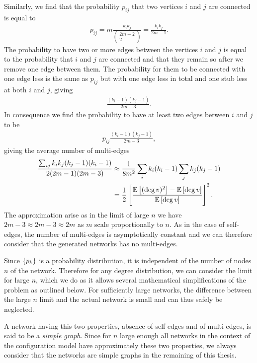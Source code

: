 \documentclass[
11pt, %
english, %
singlespacing, %
nolistspacing, %
liststotoc, %
headsepline, %
]{MastersDoctoralThesis} %
\begin{document}
Similarly, we find that the probability $p_{ij}$ that two vertices $i$ and $j$ are connected is equal to
\begin{align}
	p_{ij} = m \frac{k_i k_j}{ \begin{pmatrix} 2m - 2 \\ 2 \end{pmatrix} } = \frac{k_i k_j}{2 m -1}.
\end{align}
The probability to have two or more edges between the vertices $i$ and $j$ is equal to the probability that $i$ and $j$ are connected and that they remain so after we remove one edge between them. The probability for them to be connected with one edge less is the same as $p_{ij}$ but with one edge less in total and one stub less at both $i$ and $j$, giving
\begin{align}
	\frac{(k_i - 1)(k_j - 1)}{2 m - 3}.
\end{align}
In consequence we find the probability to have at least two edges between $i$ and $j$ to be
\begin{align}
	p_{ij} \frac{(k_i - 1)(k_j - 1)}{2 m - 3},
\end{align}
giving the average number of multi-edges
\begin{align}
	\frac{\sum_{ij} k_i k_j (k_j - 1) (k_i - 1)}{2 (2 m - 1)(2 m - 3)}  &\approx \frac{1}{8 m^2} \sum_i k_i(k_i - 1) \sum_j k_j(k_j - 1) \\
	&= \frac{1}{2}\left[ \frac{\mathbb{E}\left[ (\deg{v})^2 \right] - \mathbb{E}\left[ \deg{v} \right]}{\mathbb{E}\left[ \deg{v} \right]} \right]^2.
\end{align}
The approximation arise as in the limit of large $n$ we have $2 m - 3 \approx 2 m - 3 \approx 2 m$ as $m$ scale proportionally to $n$. As in the case of self-edges, the number of multi-edges is asymptotically constant and we can therefore consider that the generated networks has no multi-edges.

Since $\{p_k\}$ is a probability distribution, it is independent of the number of nodes $n$ of the network. Therefore for any degree distribution, we can consider the limit for large $n$, which we do as it allows several mathematical simplifications of the problem as outlined below. For sufficiently large networks, the difference between the large $n$ limit and the actual network is small and can thus safely be neglected.

A network having this two properties, absence of self-edges and of multi-edges, is said to be a \emph{simple graph}. Since for $n$ large enough all networks in the context of the configuration model have approximately these two properties, we always consider that the networks are simple graphs in the remaining of this thesis.
\end{document}
